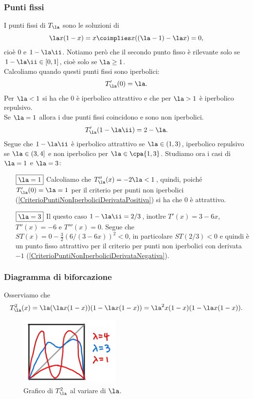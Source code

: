 \subsubsection{Punti fissi}
I punti fissi di $T_\la$ sono le soluzioni di
\[\la x(1-x)=x\coimplies x((\la-1)-\la x)=0,\]
cio\`e $0$ e $1-\la\ii$. Notiamo per\`o che il secondo punto fisso \`e rilevante solo se $1-\la\ii\in [0,1]$, cio\`e solo se $\la\geq 1$.\\
Calcoliamo quando questi punti fissi sono iperbolici:
\[T'_\la(0)=\la.\]
Per $\la<1$ si ha che $0$ \`e iperbolico attrattivo e che per $\la>1$ \`e iperbolico repulsivo.\\
Se $\la=1$ allora i due punti fissi coincidono e sono non iperbolici.
\[T'_\la(1-\la\ii)=2-\la.\]
Segue che $1-\la\ii$ \`e iperbolico attrattivo se $\la\in (1,3)$, iperbolico repulsivo se $\la\in (3,4]$ e non iperbolico per $\la\in\cpa{1,3}$.
Studiamo ora i casi di $\la=1$ e $\la=3$:
\setlength{\leftmargini}{0cm}
\begin{itemize}
\item[$\boxed{\la=1}$] Calcoliamo che $T_\la''(x)=-2\la<1$, quindi, poich\'e $T_\la'(0)=\la=1$ per il criterio per punti non iperbolici (\ref{CriterioPuntiNonIperboliciDerivataPositiva}) si ha che $0$ \`e attrattivo.
\item[$\boxed{\la=3}$] Il questo caso $1-\la\ii=2/3$, inotlre $T'(x)=3-6x$, $T''(x)=-6$ e $T'''(x)=0$. Segue che $ST(x)=0-\frac32(6/(3-6x))^2<0$, in particolare $ST(2/3)<0$ e quindi \`e un punto fisso attrattivo per il criterio per punti non iperbolici con derivata $-1$ (\ref{CriterioPuntiNonIperboliciDerivataNegativa}).
\end{itemize}

\newpage
\subsubsection{Diagramma di biforcazione}
Osserviamo che 
\[T_\la^2(x)=\la(\la x(1-x))(1-\la x(1-x))=\la^2 x(1-x)(1-\la x(1-x)).\]
\begin{figure}[!htb]
    \centering
    \includegraphics[width=5cm]{Immagini/Seconda_iterata_Logistica.png}
    \caption{Grafico di $T^2_\la$ al variare di $\la$.}
    \label{LogisticaIterata}
\end{figure}

